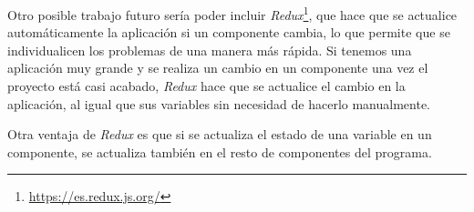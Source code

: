 \documentclass[a4paper, 12pt]{book}
\begin{document}
\vspace{5mm}
Otro posible trabajo futuro sería poder incluir \textit{Redux}\footnote{\url{https://es.redux.js.org/}}, que hace que se actualice automáticamente la aplicación si un componente cambia, lo que permite que se individualicen los problemas de una manera más rápida. Si tenemos una aplicación muy grande y se realiza un cambio en un componente una vez el proyecto está casi acabado, \textit{Redux} hace que se actualice el cambio en la aplicación, al igual que sus variables sin necesidad de hacerlo manualmente.

Otra ventaja de \textit{Redux} es que si se actualiza el estado de una variable en un componente, se actualiza también en el resto de componentes del programa.



\cleardoublepage
\appendix




\cleardoublepage



\end{document}

